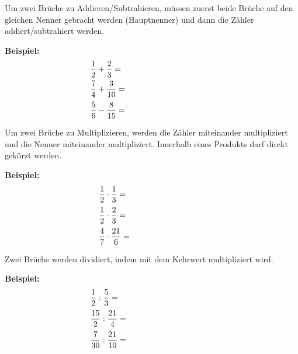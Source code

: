 \newpage
\begin{tcolorbox}
	Um zwei Brüche zu Addieren/Subtrahieren, müssen zuerst beide Brüche auf den gleichen Nenner gebracht werden (Hauptnenner) und dann die Zähler addiert/subtrahiert werden.
\end{tcolorbox}

\textbf{Beispiel:}
\begin{align*}
	&\frac{1}{2}+\frac{2}{3}=\textcolor{loes}{\frac{3}{6}+\frac{4}{6}=\frac{3+4}{6}=\frac{7}{6}}\\
	&\frac{7}{4}+\frac{3}{10}=\textcolor{loes}{\frac{35}{20}+\frac{6}{20}=\frac{35+6}{20}=\frac{41}{20}}\\
	&\frac{5}{6}-\frac{8}{15}=\textcolor{loes}{\frac{25}{30}-\frac{16}{30}=\frac{\cancel{9}^3}{\cancel{10}^{10}}=\frac{3}{10}}
\end{align*}


\begin{tcolorbox}
	Um zwei Brüche zu Multiplizieren, werden die Zähler miteinander multipliziert und die Nenner miteinander multipliziert. Innerhalb eines Produkts darf direkt gekürzt werden.
\end{tcolorbox}

\textbf{Beispiel:}
\begin{align*}
	&\frac{1}{2}\cdot\frac{1}{3}=\textcolor{loes}{\frac{1\cdot 1}{2\cdot 3}=\frac{1}{6}}\\
	&\frac{1}{2}\cdot\frac{2}{3}=\textcolor{loes}{\frac{1\cdot 2}{2\cdot 3}=\frac{1\cdot \cancel{2}}{\cancel{2}\cdot 3}=\frac{1}{3}}\\
	&\frac{4}{7}\cdot\frac{21}{6}=\textcolor{loes}{\frac{\cancel{4}^2\cdot \cancel{21}^3}{\cancel{7}^1\cdot \cancel{6}^3}=\frac{2\cdot\cancel{3}^1}{1\cdot\cancel{3}^1}=2}
\end{align*}


\begin{tcolorbox}
	Zwei Brüche werden dividiert, indem mit dem Kehrwert multipliziert wird.
\end{tcolorbox}

\textbf{Beispiel:}
\begin{align*}
	&\frac{1}{2}:\frac{5}{3}=\textcolor{loes}{\frac{1}{2}\cdot\frac{3}{5}=\frac{3}{10}}\\
	&\frac{15}{2}:\frac{21}{4}=\textcolor{loes}{\frac{15}{2}\cdot\frac{4}{21}=\frac{\cancel{15}^5\cdot\cancel{4}^2}{\cancel{21}^7\cdot \cancel{3}}=\frac{10}{7}}\\
	&\frac{7}{30}:\frac{21}{10}=\textcolor{loes}{\frac{7}{30}\cdot\frac{10}{21}=\frac{\cancel{7}^1\cdot\cancel{10}^1}{\cancel{30}^3\cdot\cancel{21}^3}=\frac{1}{9}}
\end{align*}

